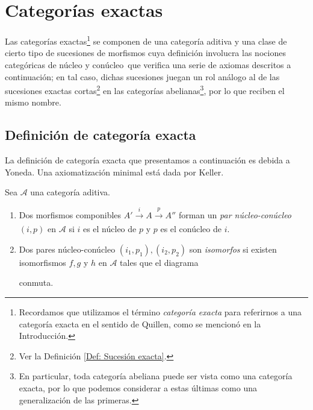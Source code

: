 \documentclass[tesis]{subfiles}
\begin{document}
\chapter{Categorías exactas} \label{Chap: Categorías exactas}

Las categorías exactas\footnote{Recordamos que utilizamos el término \emph{categoría exacta} para referirnos a una categoría exacta en el sentido de Quillen, como se mencionó en la Introducción.} se componen de una categoría aditiva y una clase de cierto tipo de sucesiones de morfismos \textemdash cuya definición involucra las nociones categóricas de núcleo y conúcleo\textemdash \ que verifica una serie de axiomas descritos a continuación; en tal caso, dichas sucesiones juegan un rol análogo al de las sucesiones exactas cortas\footnote{Ver la Definición \ref{Def: Sucesión exacta}.} en las categorías abelianas\footnote{En particular, toda categoría abeliana puede ser vista como una categoría exacta, por lo que podemos considerar a estas últimas como una generalización de las primeras.}, por lo que reciben el mismo nombre.

\section{Definición de categoría exacta} \label{Sec: Definición de categoría exacta}

La definición de categoría exacta que presentamos a continuación es debida a Yoneda\cite[\S 2]{Yoneda}. Una axiomatización minimal está dada por Keller\cite[Appendix~A]{Keller}.

\begin{Def} \label{Def: Pares núcleo-conúcleo}

    Sea $\mathscr{A}$ una categoría aditiva. 

    \begin{enumerate}[label=(\alph*)]
    
        \item Dos morfismos componibles $A'\xrightarrow[]{i}A\xrightarrow[]{p}A''$ forman un \emph{par núcleo-conúcleo} $(i,p)$ en $\mathscr{A}$ si $i$ es el núcleo de $p$ y $p$ es el conúcleo de $i$. 

        \item Dos pares núcleo-conúcleo $(i_1,p_1), (i_2,p_2)$ son \emph{isomorfos} si existen isomorfismos $f,g$ y $h$ en $\mathscr{A}$ tales que el diagrama
    \begin{center}
    \end{center}
    conmuta.
    \end{enumerate}
\end{Def}
\end{document}
